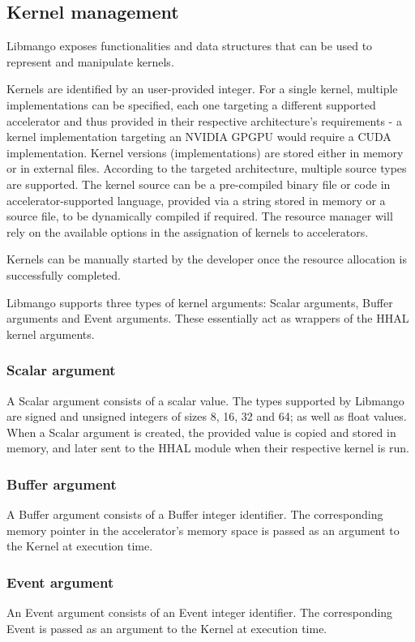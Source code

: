 \subsection{Kernel management}
Libmango exposes functionalities and data structures that can be used to represent and manipulate kernels.

Kernels are identified by an user-provided integer. For a single kernel, multiple implementations can be specified, each one targeting a different supported accelerator and thus provided in their respective architecture's requirements - a kernel implementation targeting an NVIDIA GPGPU would require a CUDA implementation.
Kernel versions (implementations) are stored either in memory or in external files. According to the targeted architecture, multiple source types are supported. The kernel source can be a pre-compiled binary file or code in accelerator-supported language, provided via a string stored in memory or a source file, to be dynamically compiled if required.
The resource manager will rely on the available options in the assignation of kernels to accelerators.

Kernels can be manually started by the developer once the resource allocation is successfully completed.

Libmango supports three types of kernel arguments: Scalar arguments, Buffer arguments and Event arguments.
These essentially act as wrappers of the HHAL kernel arguments.

\subsubsection{Scalar argument}
A Scalar argument consists of a scalar value. The types supported by Libmango are signed and unsigned integers of sizes 8, 16, 32 and 64; as well as float values.
When a Scalar argument is created, the provided value is copied and stored in memory, and later sent to the HHAL module when their respective kernel is run. 

\subsubsection{Buffer argument}
A Buffer argument consists of a Buffer integer identifier. The corresponding memory pointer in the accelerator's memory space is passed as an argument to the Kernel at execution time.

\subsubsection{Event argument}
An Event argument consists of an Event integer identifier. The corresponding Event is passed as an argument to the Kernel at execution time.


